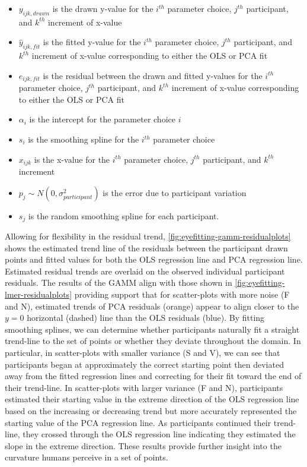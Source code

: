 \documentclass[12pt]{article}
\providecommand{\tightlist}{%
  \setlength{\itemsep}{0pt}\setlength{\parskip}{0pt}}
\begin{document}
\begin{itemize}
\tightlist
\item
  \(y_{ijk,drawn}\) is the drawn y-value for the \(i^{th}\) parameter
  choice, \(j^{th}\) participant, and \(k^{th}\) increment of x-value
\item
  \(\hat y_{ijk,fit}\) is the fitted y-value for the \(i^{th}\)
  parameter choice, \(j^{th}\) participant, and \(k^{th}\) increment of
  x-value corresponding to either the OLS or PCA fit
\item
  \(e_{ijk,fit}\) is the residual between the drawn and fitted y-values
  for the \(i^{th}\) parameter choice, \(j^{th}\) participant, and
  \(k^{th}\) increment of x-value corresponding to either the OLS or PCA
  fit
\item
  \(\alpha_i\) is the intercept for the parameter choice \(i\)
\item
  \(s_{i}\) is the smoothing spline for the \(i^{th}\) parameter choice
\item
  \(x_{ijk}\) is the x-value for the \(i^{th}\) parameter choice,
  \(j^{th}\) participant, and \(k^{th}\) increment
\item
  \(p_{j} \sim N(0, \sigma^2_{participant})\) is the error due to
  participant variation
\item
  \(s_{j}\) is the random smoothing spline for each participant.
\end{itemize}

Allowing for flexibility in the residual trend,
\cref{fig:eyefitting-gamm-residualplots} shows the estimated trend line
of the residuals between the participant drawn points and fitted values
for both the OLS regression line and PCA regression line. Estimated
residual trends are overlaid on the observed individual participant
residuals. The results of the GAMM align with those shown in
\cref{fig:eyefitting-lmer-residualplots} providing support that for
scatter-plots with more noise (F and N), estimated trends of PCA
residuals (orange) appear to align closer to the \(y=0\) horizontal
(dashed) line than the OLS residuals (blue). By fitting smoothing
splines, we can determine whether participants naturally fit a straight
trend-line to the set of points or whether they deviate throughout the
domain. In particular, in scatter-plots with smaller variance (S and V),
we can see that participants began at approximately the correct starting
point then deviated away from the fitted regression lines and correcting
for their fit toward the end of their trend-line. In scatter-plots with
larger variance (F and N), participants estimated their starting value
in the extreme direction of the OLS regression line based on the
increasing or decreasing trend but more accurately represented the
starting value of the PCA regression line. As participants continued
their trend-line, they crossed through the OLS regression line
indicating they estimated the slope in the extreme direction. These
results provide further insight into the curvature humans perceive in a
set of points.
\end{document}
